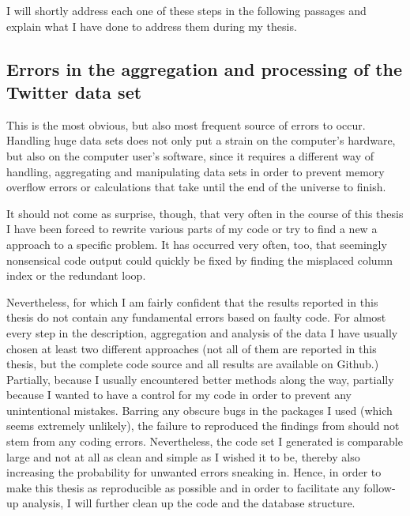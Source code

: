 \documentclass[11pt, a4paper,twoside]{report}\usepackage[]{graphicx}\usepackage[]{color}
\begin{document}
I will shortly address each one of these steps in the following passages and explain what I have done to address them during my thesis. 

\subsection{Errors in the aggregation and processing of the Twitter data set}
This is the most obvious, but also most frequent source of errors to occur. Handling huge data sets does not only put a strain on the computer's hardware, but also on the computer user's software, since it requires a different way of handling, aggregating and manipulating data sets in order to prevent memory overflow errors or calculations that take until the end of the universe to finish.

It should not come as surprise, though, that very often in the course of this thesis I have been forced to rewrite various parts of my code or try to find a new a approach to a specific problem. It has occurred very often, too, that seemingly nonsensical code output could quickly be fixed by finding the misplaced column index or the redundant loop.

Nevertheless, for which I am fairly confident that the results reported in this thesis do not contain any fundamental errors based on faulty code. For almost every step in the description, aggregation and analysis of the data I have usually chosen at least two different approaches (not all of them are reported in this thesis, but the complete code source and all results are available on Github.) Partially, because I usually encountered better methods along the way, partially because I wanted to have a control for my code in order to prevent any unintentional mistakes. Barring any obscure bugs in the packages I used (which seems extremely unlikely), the failure to reproduced the findings from \cite{bodnar_data_2015} should not stem from any coding errors. Nevertheless, the code set I generated is comparable large and not at all as clean and simple as I wished it to be, thereby also increasing the probability for unwanted errors sneaking in. Hence, in order to make this thesis as reproducible as possible and in order to facilitate any follow-up analysis, I will further clean up the code and the database structure.
\end{document}

